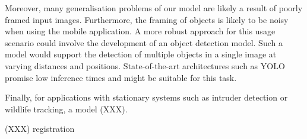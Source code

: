 \documentclass{l4proj}
\begin{document}
Moreover, many generalisation problems of our model are likely a result of poorly framed input images. Furthermore, the framing of objects is likely to be noisy when using the mobile application. A more robust approach for this usage scenario could involve the development of an object detection model. Such a model would support the detection of multiple objects in a single image at varying distances and positions. State-of-the-art architectures such as YOLO \citep{redmon_you_2016, redmon_yolov3_2018} promise low inference times and might be suitable for this task. 

Finally, for applications with stationary systems such as intruder detection or wildlife tracking, a model (XXX).

(XXX) registration

%
% 
\end{document}
